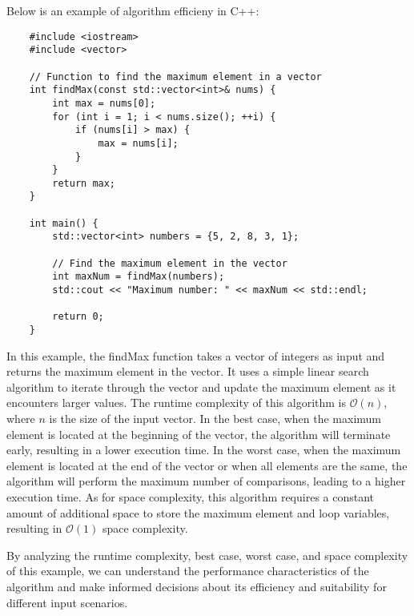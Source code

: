 \begin{solution}
    Below is an example of algorithm efficieny in C++: \\
    \horizontalline
    \begin{verbatim}
    #include <iostream>
    #include <vector>
    
    // Function to find the maximum element in a vector
    int findMax(const std::vector<int>& nums) {
        int max = nums[0];
        for (int i = 1; i < nums.size(); ++i) {
            if (nums[i] > max) {
                max = nums[i];
            }
        }
        return max;
    }
    
    int main() {
        std::vector<int> numbers = {5, 2, 8, 3, 1};
    
        // Find the maximum element in the vector
        int maxNum = findMax(numbers);
        std::cout << "Maximum number: " << maxNum << std::endl;
    
        return 0;
    }        
    \end{verbatim}
    
    \horizontalline

    \noindent In this example, the findMax function takes a vector of integers as input and returns the maximum element in the vector. It uses a simple linear search algorithm to iterate through the vector and update the maximum element as it encounters larger values. The runtime complexity of this algorithm is $\mathcal{O}(n)$, where $n$ is the size of the input vector. In the best case, when the maximum element is located at the beginning 
    of the vector, the algorithm will terminate early, resulting in a lower execution time. In the worst case, when the maximum element is located at the end of the vector or when all elements are the same, the algorithm will perform the maximum number of comparisons, leading to a higher execution time. As for space complexity, this algorithm requires a constant amount of additional space to store the maximum element and loop variables, 
    resulting in $\mathcal{O}(1)$ space complexity.

    \noindent By analyzing the runtime complexity, best case, worst case, and space complexity of this example, we can understand the performance characteristics of the algorithm and make informed decisions about its efficiency and suitability for different input scenarios.
\end{solution}